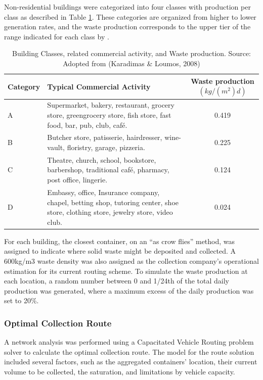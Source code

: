 \documentclass[authoryear,preprint,review,12pt]{elsarticle}
\begin{document}
    Non-residential buildings were categorized into four classes with production per class as described in Table \ref{tab:waste1}. These categories are organized from higher to lower generation rates, and the waste production corresponds to the upper tier of the range indicated for each class by \citet{Karadimas2008}.

    \begin{table}[h]
        \centering
        \caption{Building Classes, related commercial activity, and Waste production. Source: Adopted from (Karadimas \& Loumos, 2008)}
        \small
        \label{tab:waste1}
        \begin{tabularx}{\linewidth}{l X c}
            \toprule
            Category&Typical Commercial Activity&Waste production 
            $(kg/(m^2)d)$\\
            \midrule
            A&Supermarket, bakery, restaurant, grocery store, greengrocery store, fish store, fast food, bar, pub, club, café.&0.419\\
            B&Butcher store, patisserie, hairdresser, wine-vault, floristry, garage, pizzeria.&0.225\\
            C&Theatre, church, school, bookstore, barbershop, traditional café, pharmacy, post office, lingerie.&0.124\\
            D&Embassy, office, Insurance company, chapel, betting shop, tutoring center, shoe store, clothing store, jewelry store, video club.&0.024\\
            \bottomrule        
        \end{tabularx}
    \end{table}

    For each building, the closest container, on an “as crow flies” method, was assigned to indicate where solid waste might be deposited and collected. A 600kg/m3 waste density was also assigned as the collection company's operational estimation for its current routing scheme. To simulate the waste production at each location, a random number between 0 and 1/24th of the total daily production was generated, where a maximum excess of the daily production was set to 20\%.

    \subsubsection{Optimal Collection Route} \label{subsec:OptimalR}
    A network analysis was performed using a Capacitated Vehicle Routing problem solver \citep{ESRI2023c} to calculate the optimal collection route. The model for the route solution included several factors, such as the aggregated containers’ location, their current volume to be collected, the saturation, and limitations by vehicle capacity.
\end{document}
